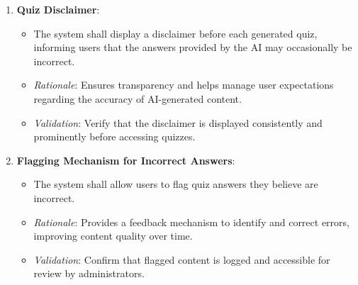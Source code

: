 \documentclass[12pt]{article}
\begin{document}
\begin{enumerate}
        \item \textbf{Quiz Disclaimer}:
    \begin{itemize}
        \item The system shall display a disclaimer before each generated quiz, informing users that the answers provided by the AI may occasionally be incorrect.
        \item \textit{Rationale}: Ensures transparency and helps manage user expectations regarding the accuracy of AI-generated content.
        \item \textit{Validation}: Verify that the disclaimer is displayed consistently and prominently before accessing quizzes.
    \end{itemize}

\item \textbf{Flagging Mechanism for Incorrect Answers}:
    \begin{itemize}
        \item The system shall allow users to flag quiz answers they believe are incorrect.
        \item \textit{Rationale}: Provides a feedback mechanism to identify and correct errors, improving content quality over time.
        \item \textit{Validation}: Confirm that flagged content is logged and accessible for review by administrators.
    \end{itemize}
        
\end{enumerate}
\end{document}
